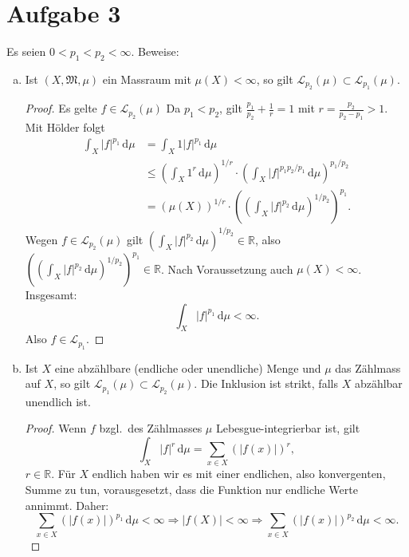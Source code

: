 \documentclass[10pt]{article}\usepackage[]{graphicx}\usepackage[]{color}
\newcommand{\R}{\mathbb{R}}
\newcommand{\df}{\,\textrm{d}}
\begin{document}
\section*{Aufgabe 3}
Es seien $0 < p_1 < p_2 < \infty$. Beweise:
\begin{enumerate}[(a)]
  \item Ist $(X, \mathfrak{M}, \mu)$ ein Massraum
        mit $\mu(X) < \infty$, so gilt
        $\mathscr{L}_{p_2}(\mu) \subset \mathscr{L}_{p_1}(\mu)$.
        
        \begin{proof}
        Es gelte $f \in \mathscr{L}_{p_2}(\mu)$
        Da $p_1 < p_2$, gilt $\frac{p_1}{p_2} + \frac{1}{r} = 1$ mit $r = \frac{p_2}{p_2-p_1} > 1$.
        Mit Hölder folgt
          \begin{align*}
            \int_X |f|^{p_1} \df \mu
            &= \int_X 1 |f|^{p_1} \df \mu \\
            &\leq \left(\int_X 1^r \df \mu\right)^{1/r} \cdot \left(\int_X |f|^{p_1p_2/p_1} \df \mu \right)^{p_1/p_2} \\
            &= (\mu(X))^{1/r} \cdot \left(\left(\int_X |f|^{p_2} \df \mu \right)^{1/p_2}\right)^{p_1}.
          \end{align*}
          Wegen $f \in \mathscr{L}_{p_2}(\mu)$ 
          gilt $\left(\int_X |f|^{p_2} \df \mu \right)^{1/p_2} \in \R$,
          also $\left(\left(\int_X |f|^{p_2} \df \mu \right)^{1/p_2}\right)^{p_1} \in \R$.
          Nach Voraussetzung auch $\mu(X) < \infty$.
          Insgesamt:
          \[
             \int_X |f|^{p_1} \df \mu < \infty.
          \]
          Also $f \in \mathscr{L}_{p_1}$.
        \end{proof}
        
  \item Ist $X$ eine abzählbare (endliche oder unendliche)
        Menge und $\mu$ das Zählmass auf $X$,
        so gilt $\mathscr{L}_{p_1}(\mu) \subset \mathscr{L}_{p_2}(\mu)$.
        Die Inklusion ist strikt, falls $X$ 
        abzählbar unendlich ist.
        
        \begin{proof}
          Wenn $f$ bzgl.\ des Zählmasses $\mu$ 
          Lebesgue-integrierbar ist, gilt
          \[
            \int_X |f|^r \df \mu = \sum_{x \in X} (|f(x)|)^r,
          \]
          $r \in \R$.
          Für $X$ endlich haben wir es mit einer endlichen,
          also konvergenten, Summe zu tun, vorausgesetzt,
          dass die Funktion nur endliche Werte annimmt.
          Daher: 
          \[
            \sum_{x \in X} (|f(x)|)^{p_1} \df \mu < \infty 
            \Rightarrow |f(X)| < \infty 
            \Rightarrow \sum_{x \in X} (|f(x)|)^{p_2} \df \mu < \infty.
          \]
          

\end{proof}
\end{enumerate}
\end{document}

